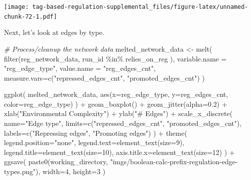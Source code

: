 \documentclass[
]{book}
\newenvironment{Shaded}{\begin{snugshade}}{\end{snugshade}}
\newcommand{\AttributeTok}[1]{\textcolor[rgb]{0.77,0.63,0.00}{#1}}
\newcommand{\CommentTok}[1]{\textcolor[rgb]{0.56,0.35,0.01}{\textit{#1}}}
\newcommand{\DecValTok}[1]{\textcolor[rgb]{0.00,0.00,0.81}{#1}}
\newcommand{\FloatTok}[1]{\textcolor[rgb]{0.00,0.00,0.81}{#1}}
\newcommand{\FunctionTok}[1]{\textcolor[rgb]{0.00,0.00,0.00}{#1}}
\newcommand{\NormalTok}[1]{#1}
\newcommand{\OtherTok}[1]{\textcolor[rgb]{0.56,0.35,0.01}{#1}}
\newcommand{\SpecialCharTok}[1]{\textcolor[rgb]{0.00,0.00,0.00}{#1}}
\newcommand{\StringTok}[1]{\textcolor[rgb]{0.31,0.60,0.02}{#1}}
\begin{document}
\texttt{[image: tag-based-regulation-supplemental\_files/figure-latex/unnamed-chunk-72-1.pdf]}

Next, let's look at edges by type.

\begin{Shaded}
\begin{Highlighting}[]
\CommentTok{\# Process/cleanup the network data}
\NormalTok{melted\_network\_data }\OtherTok{\textless{}{-}} \FunctionTok{melt}\NormalTok{(}
  \FunctionTok{filter}\NormalTok{(reg\_network\_data,}
\NormalTok{         run\_id }\SpecialCharTok{\%in\%}\NormalTok{ relies\_on\_reg}
\NormalTok{        ),}
  \AttributeTok{variable.name =} \StringTok{"reg\_edge\_type"}\NormalTok{,}
  \AttributeTok{value.name =} \StringTok{"reg\_edges\_cnt"}\NormalTok{,}
  \AttributeTok{measure.vars=}\FunctionTok{c}\NormalTok{(}\StringTok{"repressed\_edges\_cnt"}\NormalTok{, }\StringTok{"promoted\_edges\_cnt"}\NormalTok{)}
\NormalTok{)}

\FunctionTok{ggplot}\NormalTok{( melted\_network\_data, }\FunctionTok{aes}\NormalTok{(}\AttributeTok{x=}\NormalTok{reg\_edge\_type, }\AttributeTok{y=}\NormalTok{reg\_edges\_cnt, }\AttributeTok{color=}\NormalTok{reg\_edge\_type) ) }\SpecialCharTok{+}
  \FunctionTok{geom\_boxplot}\NormalTok{() }\SpecialCharTok{+}
  \FunctionTok{geom\_jitter}\NormalTok{(}\AttributeTok{alpha=}\FloatTok{0.2}\NormalTok{) }\SpecialCharTok{+}
  \FunctionTok{xlab}\NormalTok{(}\StringTok{"Environmental Complexity"}\NormalTok{) }\SpecialCharTok{+}
  \FunctionTok{ylab}\NormalTok{(}\StringTok{"\# Edges"}\NormalTok{) }\SpecialCharTok{+}
  \FunctionTok{scale\_x\_discrete}\NormalTok{(}
    \AttributeTok{name=}\StringTok{"Edge type"}\NormalTok{,}
    \AttributeTok{limits=}\FunctionTok{c}\NormalTok{(}\StringTok{"repressed\_edges\_cnt"}\NormalTok{, }\StringTok{"promoted\_edges\_cnt"}\NormalTok{),}
    \AttributeTok{labels=}\FunctionTok{c}\NormalTok{(}\StringTok{"Repressing edges"}\NormalTok{, }\StringTok{"Promoting edges"}\NormalTok{)}
\NormalTok{  ) }\SpecialCharTok{+}
  \FunctionTok{theme}\NormalTok{(}
    \AttributeTok{legend.position=}\StringTok{"none"}\NormalTok{,}
    \AttributeTok{legend.text=}\FunctionTok{element\_text}\NormalTok{(}\AttributeTok{size=}\DecValTok{9}\NormalTok{),}
    \AttributeTok{legend.title=}\FunctionTok{element\_text}\NormalTok{(}\AttributeTok{size=}\DecValTok{10}\NormalTok{),}
    \AttributeTok{axis.title.x=}\FunctionTok{element\_text}\NormalTok{(}\AttributeTok{size=}\DecValTok{12}\NormalTok{)}
\NormalTok{  ) }\SpecialCharTok{+}
  \FunctionTok{ggsave}\NormalTok{(}
    \FunctionTok{paste0}\NormalTok{(working\_directory, }\StringTok{"imgs/boolean{-}calc{-}prefix{-}regulation{-}edge{-}types.png"}\NormalTok{),}
    \AttributeTok{width=}\DecValTok{4}\NormalTok{,}
    \AttributeTok{height=}\DecValTok{3}
\NormalTok{  )}
\end{Highlighting}
\end{Shaded}
\end{document}
